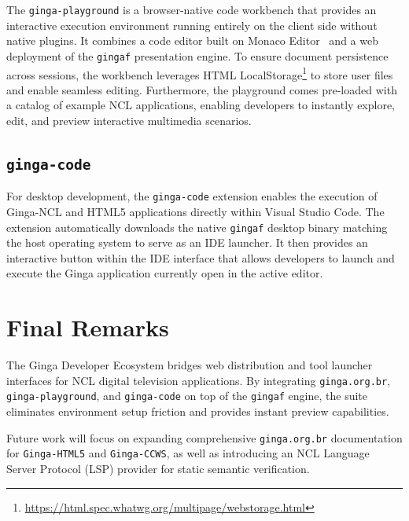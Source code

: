 \documentclass[sigconf,authorversion,review,authordraft]{webmedia}
\begin{document}
The \texttt{ginga-playground} is a browser-native code workbench that provides an interactive execution environment running entirely on the client side without native plugins. It combines a code editor built on Monaco Editor~\cite{monaco_editor} and a web deployment of the \texttt{gingaf} presentation engine. To ensure document persistence across sessions, the workbench leverages HTML LocalStorage\footnote{\url{https://html.spec.whatwg.org/multipage/webstorage.html}} to store user files and enable seamless editing. Furthermore, the playground comes pre-loaded with a catalog of example NCL applications, enabling developers to instantly explore, edit, and preview interactive multimedia scenarios.

\subsection{\texttt{ginga-code}}

For desktop development, the \texttt{ginga-code} extension enables the execution of Ginga-NCL and HTML5 applications directly within Visual Studio Code. The extension automatically downloads the native \texttt{gingaf} desktop binary matching the host operating system to serve as an IDE launcher. It then provides an interactive button within the IDE interface that allows developers to launch and execute the Ginga application currently open in the active editor.

\section{Final Remarks}
\label{sec:remarks}

The Ginga Developer Ecosystem bridges web distribution and tool launcher interfaces for NCL digital television applications. By integrating \texttt{ginga.org.br}, \texttt{ginga-playground}, and \texttt{ginga-code} on top of the \texttt{gingaf} engine, the suite eliminates environment setup friction and provides instant preview capabilities.

Future work will focus on expanding comprehensive \texttt{ginga.org.br} documentation for \texttt{Ginga-HTML5} and \texttt{Ginga-CCWS}, as well as introducing an NCL Language Server Protocol (LSP) provider for static semantic verification.



\end{document}
